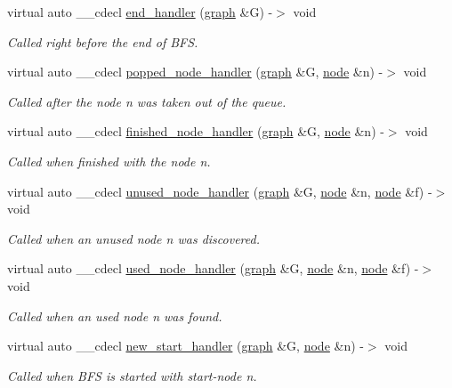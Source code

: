 \begin{DoxyCompactItemize}
virtual auto \+\_\+\+\_\+cdecl \mbox{\hyperlink{classbfs_a6c31ed93b4646218a90ded9ef7bb8366}{end\+\_\+handler}} (\mbox{\hyperlink{classgraph}{graph}} \&G) -\/$>$ void
\begin{DoxyCompactList}\small\item\em Called right before the end of B\+FS. \end{DoxyCompactList}\item 
virtual auto \+\_\+\+\_\+cdecl \mbox{\hyperlink{classbfs_a4ae61f9bbdfddf3f3a8b083e1aed9eeb}{popped\+\_\+node\+\_\+handler}} (\mbox{\hyperlink{classgraph}{graph}} \&G, \mbox{\hyperlink{classnode}{node}} \&n) -\/$>$ void
\begin{DoxyCompactList}\small\item\em Called after the node {\itshape n} was taken out of the queue. \end{DoxyCompactList}\item 
virtual auto \+\_\+\+\_\+cdecl \mbox{\hyperlink{classbfs_a4543e9eb32673c20271baea923340ab3}{finished\+\_\+node\+\_\+handler}} (\mbox{\hyperlink{classgraph}{graph}} \&G, \mbox{\hyperlink{classnode}{node}} \&n) -\/$>$ void
\begin{DoxyCompactList}\small\item\em Called when finished with the node {\itshape n}. \end{DoxyCompactList}\item 
virtual auto \+\_\+\+\_\+cdecl \mbox{\hyperlink{classbfs_a39cda7554a4ddce1331af32271904faa}{unused\+\_\+node\+\_\+handler}} (\mbox{\hyperlink{classgraph}{graph}} \&G, \mbox{\hyperlink{classnode}{node}} \&n, \mbox{\hyperlink{classnode}{node}} \&f) -\/$>$ void
\begin{DoxyCompactList}\small\item\em Called when an unused node {\itshape n} was discovered. \end{DoxyCompactList}\item 
virtual auto \+\_\+\+\_\+cdecl \mbox{\hyperlink{classbfs_a85beb51af51c14a193b3cbf09e2aa9fc}{used\+\_\+node\+\_\+handler}} (\mbox{\hyperlink{classgraph}{graph}} \&G, \mbox{\hyperlink{classnode}{node}} \&n, \mbox{\hyperlink{classnode}{node}} \&f) -\/$>$ void
\begin{DoxyCompactList}\small\item\em Called when an used node {\itshape n} was found. \end{DoxyCompactList}\item 
virtual auto \+\_\+\+\_\+cdecl \mbox{\hyperlink{classbfs_ab4b0ac22769cedc2a45e72efb3dd5565}{new\+\_\+start\+\_\+handler}} (\mbox{\hyperlink{classgraph}{graph}} \&G, \mbox{\hyperlink{classnode}{node}} \&n) -\/$>$ void
\begin{DoxyCompactList}\small\item\em Called when B\+FS is started with start-\/node {\itshape n}. \end{DoxyCompactList}\end{DoxyCompactItemize}
